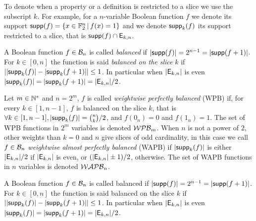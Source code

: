 \documentclass{llncs}
\begin{document}
\fi	

\ifnum{}
\fi 

To denote when a property or a definition is restricted to a slice we use the subscript $k$. 
For example, for a $n$-variable Boolean function $f$ we denote its support $\mathsf{supp}(f)=\{x\in \mathbb{F}_2^n \, | \, f(x)=1  \}$ and we denote $\mathsf{supp}_{k}(f)$ its support restricted to a slice, that is $\mathsf{supp}(f)\cap \mathsf{E}_{k,n}$.

\ifnum{}
A Boolean function $f\in \mathcal{B}_n$ is called \emph{balanced} if $|\mathsf{supp}(f)|=2^{n-1}=|\mathsf{supp}(f+1)|$.	For $k\in [0,n]$ the function is said \emph{balanced on the slice} $k$ if $||\mathsf{supp}_{k}(f)|-|\mathsf{supp}_{k}(f+1)| |\le 1$. In particular when $|\mathsf{E}_{k,n}|$ is even $|\mathsf{supp}_{k}(f)|=|\mathsf{supp}_{k}(f+1)|=|\mathsf{E}_{k,n}|/2$. 

Let $m\in \mathbb{N}^*$ and $n=2^m$, $f$ is called \emph{weightwise perfectly balanced} (WPB) if, for every $k\in[1,n-1]$, $f$ is balanced on the slice $k$, that is $\forall k \in [1,n-1], |\mathsf{supp}_{k}(f)|=\binom{n}{k}/2$, and $f(0_n)=0$ and $f(1_n)=1$.	The set of WPB functions in $2^m$ variables is denoted $\mathcal{WPB}_{m}$. When $n$ is not a power of $2$, other weights than $k=0$ and $n$ give slices of odd cardinality, in this case we call $f\in \mathcal{B}_{n}$ \emph{weightwise almost perfectly balanced} (WAPB)  if $|\mathsf{supp}_{k}(f)|$ is either $|\mathsf{E}_{k,n}|/2$  if $|\mathsf{E}_{k,n}|$  is even, or $(|\mathsf{E}_{k,n}|\pm 1)/2$, otherwise.
	The set of WAPB functions in $n$ variables is denoted $\mathcal{WAPB}_{n}$.
\else
\begin{definition}[Balancedness]\label{def:balancedness}
	A Boolean function $f\in \mathcal{B}_n$ is called balanced if $|\mathsf{supp}(f)|=2^{n-1}=|\mathsf{supp}(f+1)|$. 
	For $k\in [0,n]$ the function is said balanced on the slice $k$ if $||\mathsf{supp}_{k}(f)|-|\mathsf{supp}_{k}(f+1)| |\le 1$. In particular when $|\mathsf{E}_{k,n}|$ is even $|\mathsf{supp}_{k}(f)|=|\mathsf{supp}_{k}(f+1)|=|\mathsf{E}_{k,n}|/2$.
\end{definition}
\end{document}
